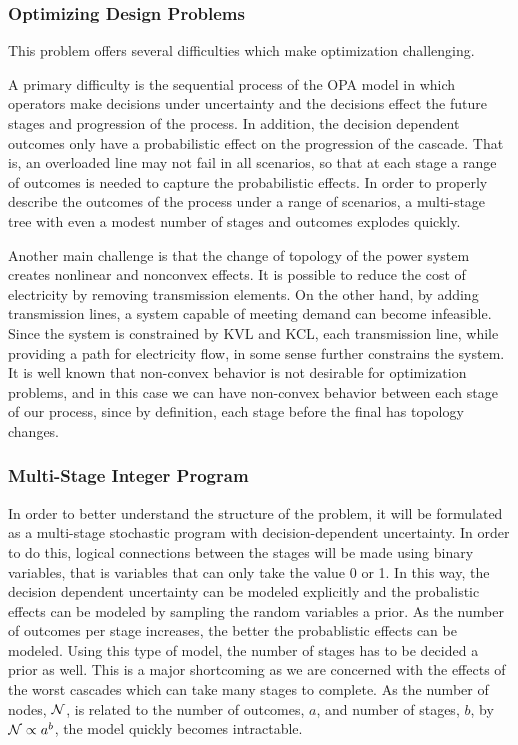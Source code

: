 \subsubsection{Optimizing Design Problems}
This problem offers several difficulties which make optimization challenging.  

A primary difficulty is the sequential process of the OPA model in which operators make decisions under uncertainty and the decisions effect the future stages and progression of the process.  In addition, the decision dependent outcomes only have a probabilistic effect on the progression of the cascade.  That is, an overloaded line may not fail in all scenarios, so that at each stage a range of outcomes is needed to capture the probabilistic effects.  In order to properly describe the outcomes of the process under a range of scenarios, a multi-stage tree with even a modest number of stages and outcomes explodes quickly.

Another main challenge is that the change of topology of the power system creates nonlinear and nonconvex effects.  It is possible to reduce the cost of electricity by removing transmission elements.  On the other hand, by adding transmission lines, a system capable of meeting demand can become infeasible.  Since the system is constrained by KVL and KCL, each transmission line, while providing a path for electricity flow, in some sense further constrains the system.  It is well known that non-convex behavior is not desirable for optimization problems, and in this case we can have non-convex behavior between each stage of our process, since by definition, each stage before the final has topology changes.

\subsubsection{Multi-Stage Integer Program}
In order to better understand the structure of the problem, it will be formulated as a multi-stage stochastic program with decision-dependent uncertainty.  In order to do this, logical connections between the stages will be made using binary variables, that is variables that can only take the value 0 or 1.  In this way, the decision dependent uncertainty can be modeled explicitly and the probalistic effects can be modeled by sampling the random variables a prior.  As the number of outcomes per stage increases, the better the probablistic effects can be modeled.  Using this type of model, the number of stages has to be decided a prior as well.  This is a major shortcoming as we are concerned with the effects of the worst cascades which can take many stages to complete.  As the number of nodes, $\mathcal{N}$, is related to the number of outcomes, $a$, and number of stages, $b$, by $\mathcal{N} \propto a^{b}$, the model quickly becomes intractable. 

